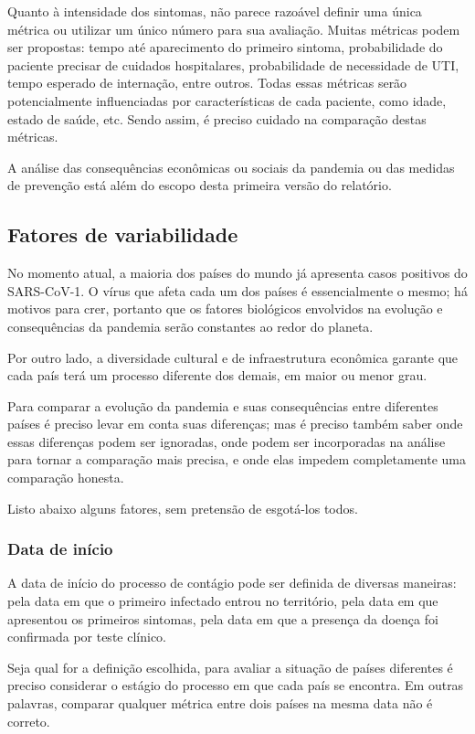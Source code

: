 \documentclass[12pt]{extarticle}
\begin{document}
Quanto à intensidade dos sintomas, não parece razoável definir uma única métrica ou utilizar um único número para sua avaliação. Muitas métricas podem ser propostas: tempo até aparecimento do primeiro sintoma, probabilidade do paciente precisar de cuidados hospitalares, probabilidade de necessidade de UTI, tempo esperado de internação, entre outros. Todas essas métricas serão potencialmente influenciadas por características de cada paciente, como idade, estado de saúde, etc. Sendo assim, é preciso cuidado na comparação destas métricas.

A análise das consequências econômicas ou sociais da pandemia ou das medidas de prevenção está além do escopo desta primeira versão do relatório.

\subsection{Fatores de variabilidade}

No momento atual, a maioria dos países do mundo já apresenta casos positivos do SARS-CoV-1. O vírus que afeta cada um dos países é essencialmente o mesmo; há motivos para crer, portanto que os fatores biológicos envolvidos na evolução e consequências da pandemia serão constantes ao redor do planeta.

Por outro lado, a diversidade cultural e de infraestrutura econômica garante que cada país terá um processo diferente dos demais, em maior ou menor grau.

Para comparar a evolução da pandemia e suas consequências entre diferentes países é preciso levar em conta suas diferenças; mas é preciso também saber onde essas diferenças podem ser ignoradas, onde podem ser incorporadas na análise para tornar a comparação mais precisa, e onde elas impedem completamente uma comparação honesta. 

Listo abaixo alguns fatores, sem pretensão de esgotá-los todos.

\subsubsection{Data de início}

A data de início do processo de contágio pode ser definida de diversas maneiras: pela data em que o primeiro infectado entrou no território, pela data em que apresentou os primeiros sintomas, pela data em que a presença da doença foi confirmada por teste clínico.

Seja qual for a definição escolhida, para avaliar a situação de países diferentes é preciso considerar o estágio do processo em que cada país se encontra. Em outras palavras, comparar qualquer métrica entre dois países na mesma data não é correto.
\end{document}
